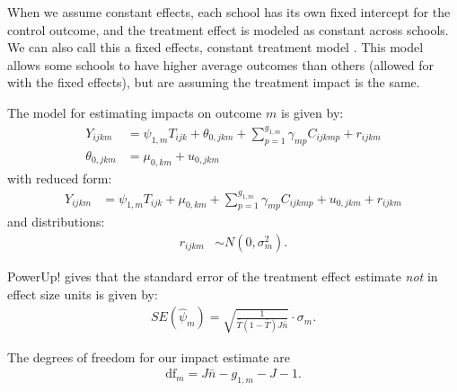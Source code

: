 \documentclass[12pt]{article}
\begin{document}
When we assume constant effects, each school has its own fixed intercept for the control outcome, and the treatment effect is modeled as constant across schools.
We can also call this a fixed effects, constant treatment model \citep{Miratrix2020}.
This model allows some schools to have higher average outcomes than others (allowed for with the fixed effects), but are assuming the treatment impact is the same.

The model for estimating impacts on outcome $m$ is given by:
\begin{align}
Y_{ijkm} &= \psi_{1,m} T_{ijk} + \theta_{0,jkm} + \sum_{p=1}^{g_{1,m}} \gamma_{mp} C_{ijkmp} + r_{ijkm}\\
\nonumber \theta_{0,jkm} &= \mu_{0,km} + u_{0,jkm}
\end{align}
with reduced form:
\begin{align}
Y_{ijkm} &= \psi_{1,m} T_{ijk} + \mu_{0,km} + \sum_{p=1}^{g_{1,m}} \gamma_{mp} C_{ijkmp} + u_{0,jkm} + r_{ijkm}
\end{align}
and distributions:
\begin{align}
r_{ijkm} &\sim N\left(0, \sigma^2_m\right).
\end{align}

PowerUp! gives that the standard error of the treatment effect estimate \emph{not} in effect size units is given by:
\begin{align}SE( \hat{\psi}_m ) = \sqrt{\frac{1}{\bar{T}(1 - \bar{T}) J \bar{n}}} \cdot \sigma_m .\end{align}

The degrees of freedom for our impact estimate are
\begin{align}\text{df}_m = J \bar{n} - g_{1,m} - J - 1.\end{align}
\end{document}
